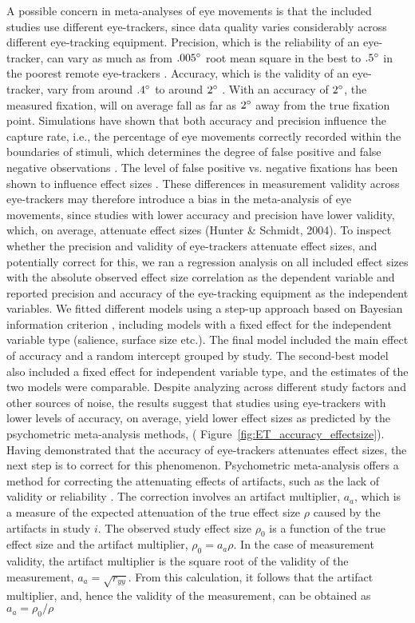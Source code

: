 A possible concern in meta-analyses of eye movements is that the included studies use different eye-trackers, since data quality varies considerably across different eye-tracking equipment. Precision, which is the reliability of an eye-tracker, can vary as much as from $.005\degree$ root mean square in the best to $.5\degree$ in the poorest remote eye-trackers \citep{holmqvist2015a}. Accuracy, which is the validity of an eye-tracker, vary from around $.4\degree$ to around $2\degree$ \citep{holmqvist2015a}. With an accuracy of $2\degree$, the measured fixation, will on average fall as far as $2\degree$ away from the true fixation point. Simulations have shown that both accuracy and precision influence the capture rate, i.e., the percentage of eye movements correctly recorded within the boundaries of stimuli, which determines the degree of false positive and false negative observations \citep{orquin2019a}. The level of false positive vs. negative fixations has been shown to influence effect sizes \citep{orquin2016a}. These differences in measurement validity across eye-trackers may therefore introduce a bias in the meta-analysis of eye movements, since studies with lower accuracy and precision have lower validity, which, on average, attenuate effect sizes (Hunter \& Schmidt, 2004). To inspect whether the precision and validity of eye-trackers attenuate effect sizes, and potentially correct for this, we ran a regression analysis on all included effect sizes with the absolute observed effect size correlation as the dependent variable and reported precision and accuracy of the eye-tracking equipment as the independent variables. We fitted different models using a step-up approach \citep{ryoo2011model} based on Bayesian information criterion \citep{Schwarz1978}, including models with a fixed effect for the independent variable type (salience, surface size etc.). The final model included the main effect of accuracy and a random intercept grouped by study. The second-best model also included a fixed effect for independent variable type, and the estimates of the two models were comparable. Despite analyzing across different study factors and other sources of noise, the results suggest that studies using eye-trackers with lower levels of accuracy, on average, yield lower effect sizes as predicted by the psychometric meta-analysis methods, ( Figure~\ref{fig:ET_accuracy_effectsize}). Having demonstrated that the accuracy of eye-trackers attenuates effect sizes, the next step is to correct for this phenomenon. Psychometric meta-analysis offers a method for correcting the attenuating effects of artifacts, such as the lack of validity or reliability \citep{hunter2004a}. The correction involves an artifact multiplier, $a_a$, which is a measure of the expected attenuation of the true effect size $\rho$ caused by the artifacts in study $i$. The observed study effect size $\rho_0$ is a function of the true effect size and the artifact multiplier, $\rho_0 = a_a \rho$. In the case of measurement validity, the artifact multiplier is the square root of the validity of the measurement, $a_a = \sqrt{r_{yy}}$. From this calculation, it follows that the artifact multiplier, and, hence the validity of the measurement, can be obtained as $a_a = \rho_0 / \rho$ 